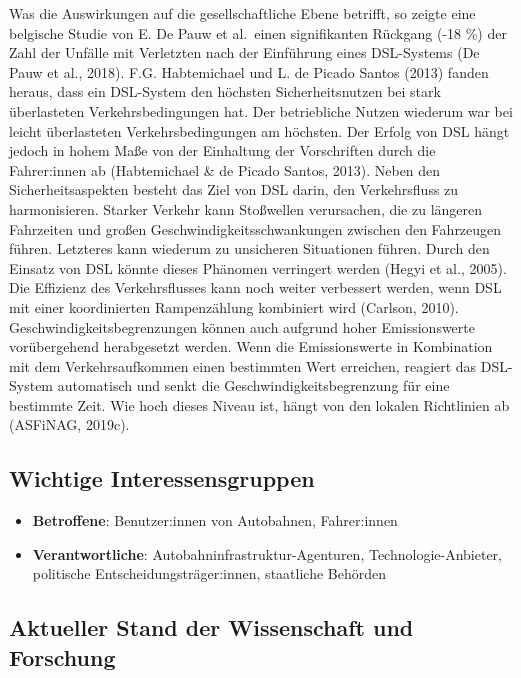 \documentclass[
]{book}
\providecommand{\tightlist}{%
  \setlength{\itemsep}{0pt}\setlength{\parskip}{0pt}}
\begin{document}
Was die Auswirkungen auf die gesellschaftliche Ebene betrifft, so zeigte eine belgische Studie von E. De Pauw et al.~einen signifikanten Rückgang (-18 \%) der Zahl der Unfälle mit Verletzten nach der Einführung eines DSL-Systems (De Pauw et al., 2018). F.G. Habtemichael und L. de Picado Santos (2013) fanden heraus, dass ein DSL-System den höchsten Sicherheitsnutzen bei stark überlasteten Verkehrsbedingungen hat. Der betriebliche Nutzen wiederum war bei leicht überlasteten Verkehrsbedingungen am höchsten. Der Erfolg von DSL hängt jedoch in hohem Maße von der Einhaltung der Vorschriften durch die Fahrer:innen ab (Habtemichael \& de Picado Santos, 2013). Neben den Sicherheitsaspekten besteht das Ziel von DSL darin, den Verkehrsfluss zu harmonisieren. Starker Verkehr kann Stoßwellen verursachen, die zu längeren Fahrzeiten und großen Geschwindigkeitsschwankungen zwischen den Fahrzeugen führen. Letzteres kann wiederum zu unsicheren Situationen führen. Durch den Einsatz von DSL könnte dieses Phänomen verringert werden (Hegyi et al., 2005). Die Effizienz des Verkehrsflusses kann noch weiter verbessert werden, wenn DSL mit einer koordinierten Rampenzählung kombiniert wird (Carlson, 2010). Geschwindigkeitsbegrenzungen können auch aufgrund hoher Emissionswerte vorübergehend herabgesetzt werden. Wenn die Emissionswerte in Kombination mit dem Verkehrsaufkommen einen bestimmten Wert erreichen, reagiert das DSL-System automatisch und senkt die Geschwindigkeitsbegrenzung für eine bestimmte Zeit. Wie hoch dieses Niveau ist, hängt von den lokalen Richtlinien ab (ASFiNAG, 2019c).

\hypertarget{wichtige-interessensgruppen-14}{%
\subsection*{Wichtige Interessensgruppen}\label{wichtige-interessensgruppen-14}}

\begin{itemize}
\tightlist
\item
  \textbf{Betroffene}: Benutzer:innen von Autobahnen, Fahrer:innen
\item
  \textbf{Verantwortliche}: Autobahninfrastruktur-Agenturen, Technologie-Anbieter, politische Entscheidungsträger:innen, staatliche Behörden
\end{itemize}

\hypertarget{aktueller-stand-der-wissenschaft-und-forschung-14}{%
\subsection*{Aktueller Stand der Wissenschaft und Forschung}\label{aktueller-stand-der-wissenschaft-und-forschung-14}}
\end{document}
